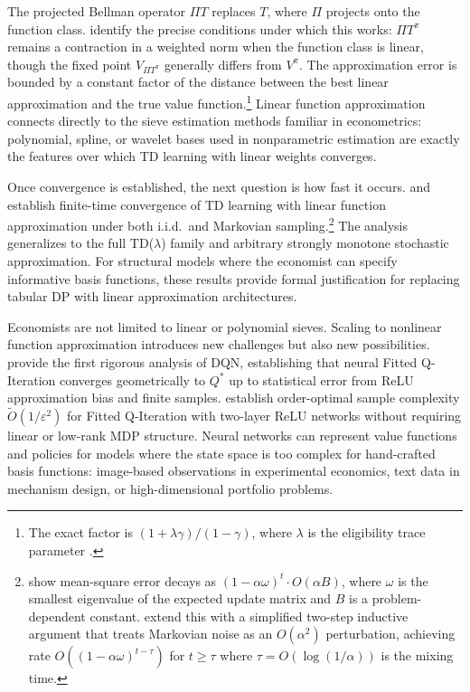 The projected Bellman operator $\Pi T$ replaces $T$, where $\Pi$ projects onto the function class. \citet{tsitsiklis1997} identify the precise conditions under which this works: $\Pi T^\pi$ remains a contraction in a weighted norm when the function class is linear, though the fixed point $V_{\Pi T^\pi}$ generally differs from $V^\pi$. The approximation error is bounded by a constant factor of the distance between the best linear approximation and the true value function.\footnote{The exact factor is $(1+\lambda\gamma)/(1-\gamma)$, where $\lambda$ is the eligibility trace parameter \citep{tsitsiklis1997}.} Linear function approximation connects directly to the sieve estimation methods familiar in econometrics: polynomial, spline, or wavelet bases used in nonparametric estimation are exactly the features over which TD learning with linear weights converges.

Once convergence is established, the next question is how fast it occurs. \citet{bhandari2021finite} and \citet{mitra2024} establish finite-time convergence of TD learning with linear function approximation under both i.i.d.\ and Markovian sampling.\footnote{\citet{bhandari2021finite} show mean-square error decays as $(1 - \alpha\omega)^t \cdot O(\alpha B)$, where $\omega$ is the smallest eigenvalue of the expected update matrix and $B$ is a problem-dependent constant. \citet{mitra2024} extend this with a simplified two-step inductive argument that treats Markovian noise as an $O(\alpha^2)$ perturbation, achieving rate $O((1-\alpha\omega)^{t-\tau})$ for $t \geq \tau$ where $\tau = O(\log(1/\alpha))$ is the mixing time.} The analysis generalizes to the full TD($\lambda$) family and arbitrary strongly monotone stochastic approximation. For structural models where the economist can specify informative basis functions, these results provide formal justification for replacing tabular DP with linear approximation architectures.

Economists are not limited to linear or polynomial sieves. Scaling to nonlinear function approximation introduces new challenges but also new possibilities. \citet{fan2020dqn} provide the first rigorous analysis of DQN, establishing that neural Fitted Q-Iteration converges geometrically to $Q^*$ up to statistical error from ReLU approximation bias and finite samples. \citet{gaur2023fqi} establish order-optimal sample complexity $\tilde{O}(1/\varepsilon^2)$ for Fitted Q-Iteration with two-layer ReLU networks without requiring linear or low-rank MDP structure. Neural networks can represent value functions and policies for models where the state space is too complex for hand-crafted basis functions: image-based observations in experimental economics, text data in mechanism design, or high-dimensional portfolio problems.

